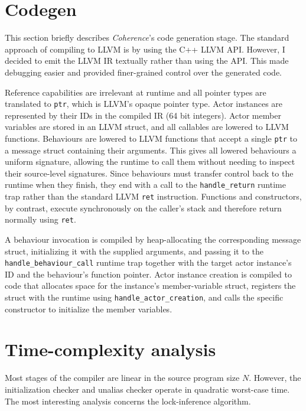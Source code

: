 \section{Codegen} \label{sec:codegen}
This section briefly describes \textit{Coherence}'s code generation stage. The standard approach of compiling to LLVM is by using the C++ LLVM API. However, I decided to emit the LLVM IR textually rather than using the API. This made debugging easier and provided finer-grained control over the generated code.

Reference capabilities are irrelevant at runtime and all pointer types are translated to \texttt{ptr}, which is LLVM's opaque pointer type. Actor instances are represented by their IDs in the compiled IR (64 bit integers). Actor member variables are stored in an LLVM struct, and all callables are lowered to LLVM functions. Behaviours are lowered to LLVM functions that accept a single \texttt{ptr} to a message struct containing their arguments. This gives all lowered behaviours a uniform signature, allowing the runtime to call them without needing to inspect their source-level signatures. Since behaviours must transfer control back to the runtime when they finish, they end with a call to the \texttt{handle\_return} runtime trap rather than the standard LLVM \texttt{ret} instruction. Functions and constructors, by contrast, execute synchronously on the caller's stack and therefore return normally using \texttt{ret}.

A behaviour invocation is compiled by heap-allocating the corresponding message struct, initializing it with the supplied arguments, and passing it to the \texttt{handle\_behaviour\_call} runtime trap together with the target actor instance's ID and the behaviour's function pointer. Actor instance creation is compiled to code that allocates space for the instance's member-variable struct, registers the struct with the runtime using \texttt{handle\_actor\_creation}, and calls the specific constructor to initialize the member variables.

\section{Time-complexity analysis} \label{sec:time-complexity-analysis}
Most stages of the compiler are linear in the source program size $N$. However, the initialization checker and unalias checker operate in quadratic worst-case time. The most interesting analysis concerns the lock-inference algorithm.

